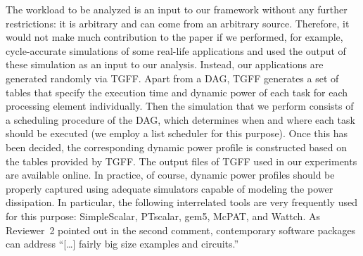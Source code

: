 \begin{authors}
The workload to be analyzed is an input to our framework without any further restrictions: it is arbitrary and can come from an arbitrary source.
Therefore, it would not make much contribution to the paper if we performed, for example, cycle-accurate simulations of some real-life applications and used the output of these simulation as an input to our analysis.
Instead, our applications are generated randomly via TGFF.
Apart from a DAG, TGFF generates a set of tables that specify the execution time and dynamic power of each task for each processing element individually.
Then the simulation that we perform consists of a scheduling procedure of the DAG, which determines when and where each task should be executed (we employ a list scheduler for this purpose).
Once this has been decided, the corresponding dynamic power profile is constructed based on the tables provided by TGFF.
The output files of TGFF used in our experiments are available online.
In practice, of course, dynamic power profiles should be properly captured using adequate simulators capable of modeling the power dissipation.
In particular, the following interrelated tools are very frequently used for this purpose: SimpleScalar, PTscalar, gem5, McPAT, and Wattch.
As Reviewer~2 pointed out in the second comment, contemporary software packages can address ``[\ldots] fairly big size examples and circuits.''


\end{authors}

